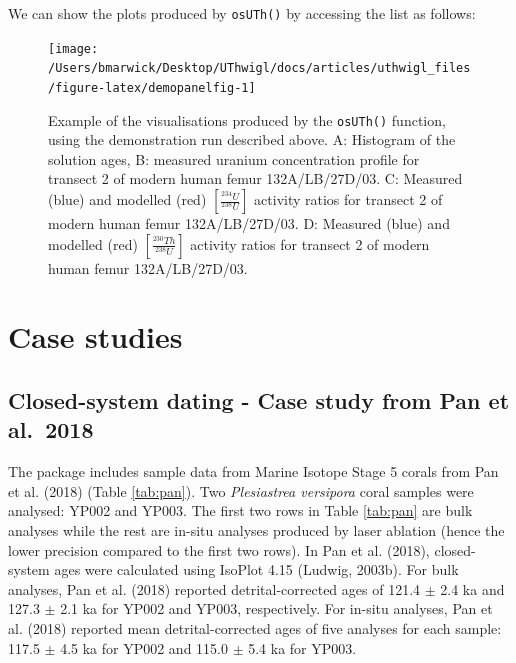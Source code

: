 \documentclass[]{elsarticle} %
\newenvironment{Shaded}{\begin{snugshade}}{\end{snugshade}}
\newcommand{\NormalTok}[1]{#1}
\newcommand{\SpecialCharTok}[1]{\textcolor[rgb]{0.00,0.00,0.00}{#1}}
\begin{document}
We can show the plots produced by \texttt{osUTh()} by accessing the list as follows:



\begin{Shaded}
\end{Shaded}

\begin{figure}
\texttt{[image: /Users/bmarwick/Desktop/UThwigl/docs/articles/uthwigl\_files/figure-latex/demopanelfig-1]} \caption{Example of the visualisations produced by the \texttt{osUTh()} function, using the demonstration run described above. A: Histogram of the solution ages, B: measured uranium concentration profile for transect 2 of modern human femur 132A/LB/27D/03. C: Measured (blue) and modelled (red) \([\frac{^{234}U}{^{238}U}]\) activity ratios for transect 2 of modern human femur 132A/LB/27D/03. D: Measured (blue) and modelled (red) \([\frac{^{230}Th}{^{238}U}]\) activity ratios for transect 2 of modern human femur 132A/LB/27D/03.}\label{fig:demopanelfig}
\end{figure}

\FloatBarrier

\newpage

\hypertarget{case-studies}{%
\section{Case studies}\label{case-studies}}

\hypertarget{closed-system-dating---case-study-from-pan-et-al.-2018}{%
\subsection{Closed-system dating - Case study from Pan et al.~2018}\label{closed-system-dating---case-study-from-pan-et-al.-2018}}

The package includes sample data from Marine Isotope Stage 5 corals from Pan et al. (2018) (Table \ref{tab:pan}). Two \emph{Plesiastrea versipora} coral samples were analysed: YP002 and YP003. The first two rows in Table \ref{tab:pan} are bulk analyses while the rest are in-situ analyses produced by laser ablation (hence the lower precision compared to the first two rows).
In Pan et al. (2018), closed-system ages were calculated using IsoPlot 4.15 (Ludwig, 2003b). For bulk analyses, Pan et al. (2018) reported detrital-corrected ages of 121.4 \(\pm\) 2.4 ka and 127.3 \(\pm\) 2.1 ka for YP002 and YP003, respectively. For in-situ analyses, Pan et al. (2018) reported mean detrital-corrected ages of five analyses for each sample: 117.5 \(\pm\) 4.5 ka for YP002 and 115.0 \(\pm\) 5.4 ka for YP003.
\end{document}
